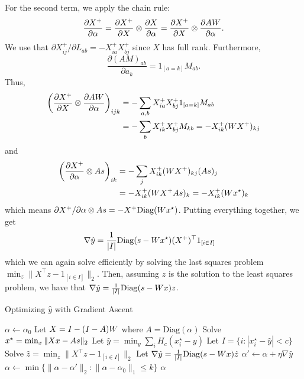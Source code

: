 For the second term, we apply the chain rule:
\[
    \frac{\partial X^+}{\partial \alpha} =
    \frac{\partial X^+}{\partial X} \otimes
    \frac{\partial X}{\partial \alpha} =
    \frac{\partial X^+}{\partial X} \otimes
    \frac{\partial A W}{\partial \alpha} .
\]
We  use that
$\partial X^+_{ij} / \partial L_{ab} = -X^+_{ia} X^+_{bj}$
since $X$ has full rank.
Furthermore, 
\[
    \frac{\partial (AM)_{ab}}{\partial a_k}
    = 1_{[a = k]} M_{ab} .
\]
Thus,
\begin{align*}
    \left( \frac{\partial X^+}{\partial X} \otimes
    \frac{\partial A W}{\partial \alpha} \right)_{ijk}
    &= - \sum_{a,b} X^+_{ia} X^+_{bj} 1_{[a = k]} M_{ab} \\
    &= - \sum_{b} X^+_{ik} X^+_{bj} M_{kb}
    = - X^+_{ik} (W X^+)_{kj}
\end{align*}
and
\begin{align*}
    \left( \frac{\partial X^+}{\partial \alpha} \otimes A s \right)_{ik} &=
    - \sum_j X^+_{ik} (W X^+)_{kj} (A s)_j \\ &=
    - X^+_{ik} (W X^+ A s)_{k} =
    - X^+_{ik} (W x^\star)_{k}
\end{align*}
which means
$\partial X^+ / \partial \alpha \otimes A s = - X^+ \mathrm{Diag}(W x^\star)$.
%
Putting everything together, we get
\begin{align}
    \label{eq:2}
    \nabla \hat y &= \frac 1 {|I|}
        \mathrm{Diag}(s - W x^\star) (X^+)^\top 1_{[i \in I]}
\end{align}
which we can again solve efficiently by solving
the last squares problem
$\min_{z} \| X^\top z - 1_{[i \in I]} \|_2$.
Then, assuming $z$ is the solution
to the least squares problem,
we have that
$\nabla \hat y = \frac 1 {|I|} \mathrm{Diag}(s - W x) z$.



\begin{algorithm}
\caption{Optimizing $\hat y$ with Gradient Ascent}
\label{alg:huber-gd}
\begin{algorithmic}[1]
    \State $\alpha \gets \alpha_0$
        \State Let $X = I - (I - A) W$ where $A = \mathrm{Diag}(\alpha)$
        \State Solve $x^\star = \min_{x} \| X x - A s \|_2$
        \State Let $\hat y = \min_{y} \sum_i H_c (x^\star_i - y)$
        \State Let $I = \{ i : |x^\star_i - \hat y| < c \}$
        \State Solve $\hat z = \min_{z} \|X^\top z - 1_{[i \in I]}\|_2$
        \State Let $\nabla \hat y = \frac 1 {|I|} \mathrm{Diag}(s - W x) \hat z$
        \State $\alpha' \gets \alpha + \eta \nabla \hat y$
        \State $\alpha \gets \min \{ \|\alpha - \alpha'\|_2 :
            \|\alpha - \alpha_0\|_1 \le k \}$
    \EndWhile
    \State \Return $\alpha$
\EndFunction
\end{algorithmic}
\end{algorithm}


